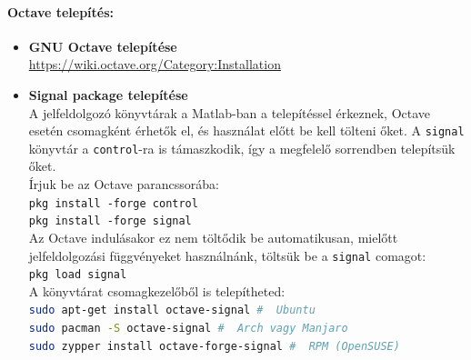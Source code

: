 \documentclass[12pt,a4paper]{article}
\begin{document}
\paragraph{Octave telepítés:} 
\begin{itemize}
	\item \textbf{GNU Octave telepítése} \\\url{https://wiki.octave.org/Category:Installation}
	\item \textbf{Signal package telepítése} \\
	A jelfeldolgozó könyvtárak a Matlab-ban a telepítéssel érkeznek, Octave esetén csomagként érhetők el, és használat előtt be kell tölteni őket. A \texttt{signal} könyvtár a \texttt{control}-ra is támaszkodik, így a megfelelő sorrendben telepítsük őket.\\
	Írjuk be az Octave parancssorába: 	\\
	\texttt{pkg install -forge control}\\
	\texttt{pkg install -forge signal}\\
	Az Octave indulásakor ez nem töltődik be automatikusan, mielőtt jelfeldolgozási függvényeket használnánk, töltsük be a \texttt{signal} comagot: \\
	\texttt{pkg load signal}\\
	A könyvtárat csomagkezelőből is telepítheted: \\
	\lstinline[language=bash,basicstyle=\normalsize\ttfamily]{sudo apt-get install octave-signal #  Ubuntu} \\
	\lstinline[language=bash,basicstyle=\normalsize\ttfamily]{sudo pacman -S octave-signal #  Arch vagy Manjaro} \\
	\lstinline[language=bash,basicstyle=\normalsize\ttfamily]{sudo zypper install octave-forge-signal #  RPM (OpenSUSE)}
\end{itemize}

\clearpage
\end{document}
